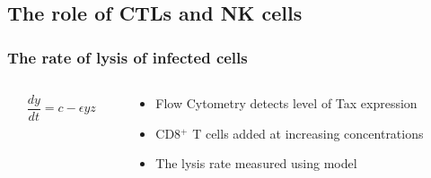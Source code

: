\documentclass[slidescentered,compress]{beamer}
\begin{document}
\subsection{The role of CTLs and NK cells}

\frame
{
\frametitle{The rate of lysis of infected cells}

\begin{columns}[l]

\begin{column}{6cm}

\begin{figure}
\end{figure}

\begin{equation*}
\frac{dy}{dt} = c - \epsilon y z
\end{equation*}

\end{column}

\begin{column}{4cm}
\begin{itemize}
\item Flow Cytometry detects level of Tax expression
\item CD8$^+$ T cells added at increasing concentrations
\item The lysis rate measured using model
\end{itemize}
\end{column}
\end{columns}

}
\end{document}
